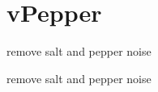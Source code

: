 \hypertarget{group__vPepper}{\section{v\-Pepper}
\label{group__vPepper}
}


remove salt and pepper noise  


remove salt and pepper noise 